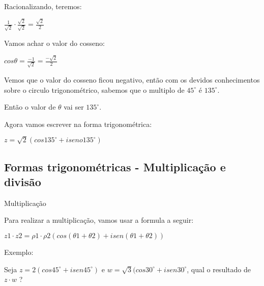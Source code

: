 \documentclass[]{article}
\begin{document}
\begin{large}
\begin{flushleft}
Racionalizando, teremos: \vspace{.3cm}

\begin{center}
    $\frac{1}{\sqrt{2}} \cdot \frac{\sqrt{2}}{\sqrt{2}} = \frac{\sqrt{2}}{2}$ \vspace{.3cm}
\end{center}

Vamos achar o valor do cosseno: \vspace{.3cm}

\begin{center}
    $cos\theta=\frac{-1}{\sqrt{2}} = \frac{-\sqrt{2}}{2}$ \vspace{.3cm}
\end{center}

Vemos que o valor do cosseno ficou negativo, então com os devidos conhecimentos sobre o circulo trigonométrico, sabemos que o multiplo de $45^\circ$ é $135^\circ$. \vspace{.3cm}

Então o valor de $\theta$ vai ser $135^\circ$. \vspace{.3cm}

Agora vamos escrever na forma trigonométrica: \vspace{.3cm}

\begin{center}
    $z=\sqrt{2}(cos135^\circ + iseno135^\circ)$ \vspace{.3cm}
\end{center}

\subsection{Formas trigonométricas - Multiplicação e divisão}

Multiplicação \vspace{.3cm}

Para realizar a multiplicação, vamos usar a formula a seguir: \vspace{.3cm}

\begin{center}
    $z1 \cdot z2=\rho1\cdot\rho2(cos(\theta1+\theta2)+isen(\theta1+\theta2))$
\end{center}

Exemplo: \vspace{.3cm}

Seja $z=2(cos45^\circ +isen45^\circ)$ e $w=\sqrt{3}(cos30^\circ +isen30^\circ$, qual o resultado de $z\cdot w$ ? \vspace{.3cm}


\end{flushleft}
\end{large}
\end{document}
